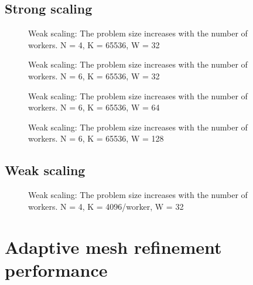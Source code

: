 \subsection{Strong scaling} \label{section:results:scaling_tests:strong}

\begin{figure}[H]
	\centering
	
	\caption{Weak scaling: The problem size increases with the number of workers. N = 4, K = 65536, W = 32}
	\label{fig:strong_scaling_N4_W32}
\end{figure}

\begin{figure}[H]
	\centering
	
	\caption{Weak scaling: The problem size increases with the number of workers. N = 6, K = 65536, W = 32}
	\label{fig:strong_scaling_N6_W32}
\end{figure}

\begin{figure}[H]
	\centering
	
	\caption{Weak scaling: The problem size increases with the number of workers. N = 6, K = 65536, W = 64}
	\label{fig:strong_scaling_N6_W64}
\end{figure}

\begin{figure}[H]
	\centering
	
	\caption{Weak scaling: The problem size increases with the number of workers. N = 6, K = 65536, W = 128}
	\label{fig:strong_scaling_N6_W128}
\end{figure}

\subsection{Weak scaling} \label{section:results:scaling_tests:weak}


\begin{figure}[H]
	\centering
	
	\caption{Weak scaling: The problem size increases with the number of workers. N = 4, K = 4096/worker, W = 32}
	\label{fig:weak_scaling}
\end{figure}

\section{Adaptive mesh refinement performance} \label{section:results:adaptivity_performance}

